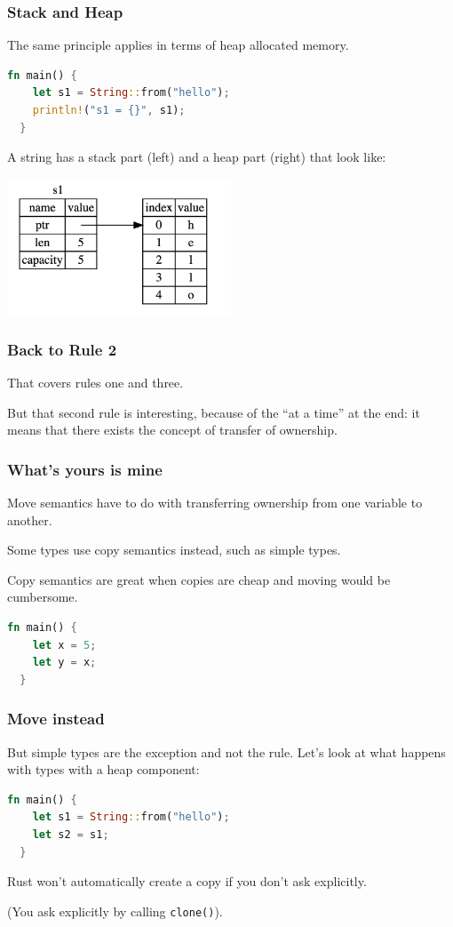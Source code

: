 \begin{frame}[fragile]
\frametitle{Stack and Heap}

The same principle applies in terms of heap allocated memory.


\begin{lstlisting}[language=Rust]
  fn main() {
    let s1 = String::from("hello");
    println!("s1 = {}", s1);
  }
\end{lstlisting}

A string has a stack part (left) and a heap part (right) that look like:
\begin{center}
\includegraphics[width=0.5\textwidth]{images/string.png} 
\end{center}

\end{frame}


\begin{frame}
\frametitle{Back to Rule 2}

That covers rules one and three.

But that second rule is interesting, because of the ``at a time'' at the end: it means that there exists the concept of transfer of ownership.


\end{frame}

\begin{frame}[fragile]
\frametitle{What's yours is mine}

Move semantics have to do with transferring ownership from one variable to another.

Some types use copy semantics instead, such as simple types.

Copy semantics are great when copies are cheap and moving would be cumbersome. 

\begin{lstlisting}[language=Rust]
  fn main() {
   	let x = 5;
	let y = x;
  }
\end{lstlisting}


\end{frame}

\begin{frame}[fragile]
\frametitle{Move instead}

But simple types are the exception and not the rule. Let's look at what happens with types with a heap component:

\begin{lstlisting}[language=Rust]
  fn main() {
    let s1 = String::from("hello");
    let s2 = s1;
  }
\end{lstlisting}


Rust won't automatically create a copy if you don't ask explicitly. 

(You ask explicitly by calling \texttt{clone()}).

\end{frame}



